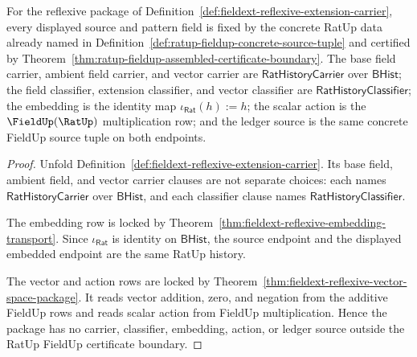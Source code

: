 \begin{theorem}
\label{thm:fieldext-ratup-reflexive-source-pattern-lock}
For the reflexive package of
Definition~\ref{def:fieldext-reflexive-extension-carrier}, every displayed
source and pattern field is fixed by the concrete RatUp data already named in
Definition~\ref{def:ratup-fieldup-concrete-source-tuple} and certified by
Theorem~\ref{thm:ratup-fieldup-assembled-certificate-boundary}. The base field
carrier, ambient field carrier, and vector carrier are
$\mathsf{RatHistoryCarrier}$ over $\mathsf{BHist}$; the field classifier,
extension classifier, and vector classifier are
$\mathsf{RatHistoryClassifier}$; the embedding is the identity map
$\iota_{\mathsf{Rat}}(h):=h$; the scalar action is the
$\FieldUp(\RatUp)$ multiplication row; and the ledger source is the same
concrete FieldUp source tuple on both endpoints.
\end{theorem}
\begin{proof}
Unfold Definition~\ref{def:fieldext-reflexive-extension-carrier}. Its base
field, ambient field, and vector carrier clauses are not separate choices:
each names $\mathsf{RatHistoryCarrier}$ over $\mathsf{BHist}$, and each
classifier clause names $\mathsf{RatHistoryClassifier}$.

The embedding row is locked by
Theorem~\ref{thm:fieldext-reflexive-embedding-transport}. Since
$\iota_{\mathsf{Rat}}$ is identity on $\mathsf{BHist}$, the source endpoint
and the displayed embedded endpoint are the same RatUp history.

The vector and action rows are locked by
Theorem~\ref{thm:fieldext-reflexive-vector-space-package}. It reads vector
addition, zero, and negation from the additive FieldUp rows and reads scalar
action from FieldUp multiplication. Hence the package has no carrier,
classifier, embedding, action, or ledger source outside the RatUp FieldUp
certificate boundary.
\end{proof}

